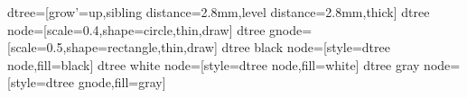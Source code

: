 





\usepackage{mathtools}
\usepackage{tikz-cd}
\makeatletter
\RequirePackage{pgf}
\RequirePackage{tikz}
\RequirePackage{xkeyval}

\tikzstyle dtree=[grow'=up,sibling distance=2.8mm,level distance=2.8mm,thick]
\tikzstyle dtree node=[scale=0.4,shape=circle,thin,draw]
\tikzstyle dtree gnode=[scale=0.5,shape=rectangle,thin,draw]
\tikzstyle dtree black node=[style=dtree node,fill=black]
\tikzstyle dtree white node=[style=dtree node,fill=white]
\tikzstyle dtree gray node=[style=dtree gnode,fill=gray]




